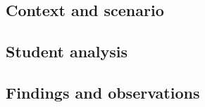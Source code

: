 \subsection{Context and scenario}\label{context-and-scenario}

\subsection{Student analysis}\label{student-analysis}

\subsection{Findings and
observations}\label{findings-and-observations}
